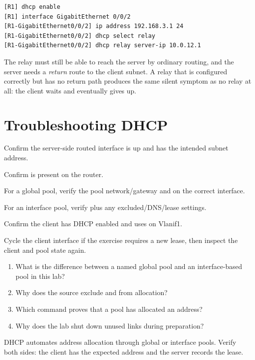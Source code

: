 \begin{lstlisting}[style=dcnterminal]
[R1] dhcp enable
[R1] interface GigabitEthernet 0/0/2
[R1-GigabitEthernet0/0/2] ip address 192.168.3.1 24
[R1-GigabitEthernet0/0/2] dhcp select relay
[R1-GigabitEthernet0/0/2] dhcp relay server-ip 10.0.12.1
\end{lstlisting}

\begin{pitfall}
The relay must still be able to reach the server by ordinary routing, and the server needs a \emph{return} route to the client subnet. A relay that is configured correctly but has no return path produces the same silent symptom as no relay at all: the client waits and eventually gives up.
\end{pitfall}

\section{Troubleshooting DHCP}
\begin{netsteps}
\item Confirm the server-side routed interface is up and has the intended subnet address.
\item Confirm  is present on the router.
\item For a global pool, verify the pool network/gateway and  on the correct interface.
\item For an interface pool, verify  plus any excluded/DNS/lease settings.
\item Confirm the client has DHCP enabled and uses  on Vlanif1.
\item Cycle the client interface if the exercise requires a new lease, then inspect the client and pool state again.
\end{netsteps}

\begin{quickcheck}
\begin{enumerate}
\item What is the difference between a named global pool and an interface-based pool in this lab?
\item Why does the source exclude  and  from allocation?
\item Which command proves that a pool has allocated an address?
\item Why does the lab shut down unused links during preparation?
\end{enumerate}
\end{quickcheck}

\begin{chapterrecap}
DHCP automates address allocation through global or interface pools. Verify both sides: the client has the expected address and the server records the lease.
\end{chapterrecap}


